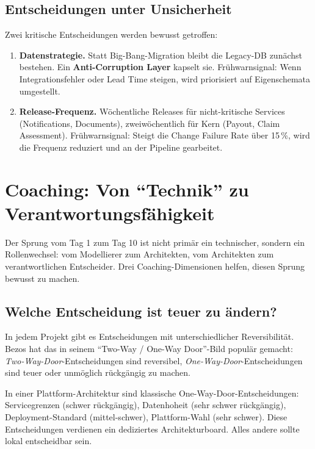 \documentclass[11pt,a4paper,oneside]{article}
\newcommand{\fachbegriff}[1]{\textbf{#1}}
\begin{document}
\subsection{Entscheidungen unter Unsicherheit}

Zwei kritische Entscheidungen werden bewusst getroffen:

\begin{enumerate}
  \item \textbf{Datenstrategie.} Statt Big-Bang-Migration bleibt die Legacy-DB zunächst bestehen. Ein \fachbegriff{Anti-Corruption Layer} kapselt sie. Frühwarnsignal: Wenn Integrationsfehler oder Lead Time steigen, wird priorisiert auf Eigenschemata umgestellt.
  \item \textbf{Release-Frequenz.} Wöchentliche Releases für nicht-kritische Services (Notifications, Documents), zweiwöchentlich für Kern (Payout, Claim Assessment). Frühwarnsignal: Steigt die Change Failure Rate über 15\,\%, wird die Frequenz reduziert und an der Pipeline gearbeitet.
\end{enumerate}

\section{Coaching: Von ``Technik'' zu Verantwortungsfähigkeit}

Der Sprung vom Tag 1 zum Tag 10 ist nicht primär ein technischer, sondern ein Rollenwechsel: vom Modellierer zum Architekten, vom Architekten zum verantwortlichen Entscheider. Drei Coaching-Dimensionen helfen, diesen Sprung bewusst zu machen.

\subsection{Welche Entscheidung ist teuer zu ändern?}

In jedem Projekt gibt es Entscheidungen mit unterschiedlicher Reversibilität. Bezos hat das in seinem ``Two-Way / One-Way Door''-Bild populär gemacht: \emph{Two-Way-Door}-Entscheidungen sind reversibel, \emph{One-Way-Door}-Entscheidungen sind teuer oder unmöglich rückgängig zu machen.

In einer Plattform-Architektur sind klassische One-Way-Door-Entscheidungen: Servicegrenzen (schwer rückgängig), Datenhoheit (sehr schwer rückgängig), Deployment-Standard (mittel-schwer), Plattform-Wahl (sehr schwer). Diese Entscheidungen verdienen ein dediziertes Architekturboard. Alles andere sollte lokal entscheidbar sein.
\end{document}
